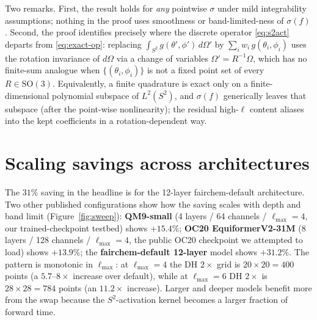 \documentclass{article}
\begin{document}
Two remarks. First, the result holds for \emph{any} pointwise $\sigma$
under mild integrability assumptions; nothing in the proof uses
smoothness or band-limited-ness of $\sigma(f)$. Second, the proof
identifies precisely where the discrete operator
\eqref{eq:s2act} departs from \eqref{eq:exact-op}: replacing
$\int_{S^2} g(\theta', \phi')\,d\Omega'$ by $\sum_i w_i\,
g(\theta_i, \phi_i)$ uses the rotation invariance of $d\Omega$ via a
change of variables $\Omega' = R^{-1}\Omega$, which has no
finite-sum analogue when $\{(\theta_i, \phi_i)\}$ is not a fixed
point set of every $R \in \mathrm{SO}(3)$. Equivalently, a finite
quadrature is exact only on a finite-dimensional polynomial subspace
of $L^2(S^2)$, and $\sigma(f)$ generically leaves that subspace
(after the point-wise nonlinearity); the residual high-$\ell$
content aliases into the kept coefficients in a
rotation-dependent way.

\section{Scaling savings across architectures}
\label{app:scale}

The $31\%$ saving in the headline is for the 12-layer fairchem-default
architecture. Two other published configurations show how the saving
scales with depth and band limit
(Figure~\ref{fig:sweep}): \textbf{QM9-small} (4 layers / 64 channels /
$\ell_{\max}{=}4$, our trained-checkpoint testbed) shows
$+15.4\%$; \textbf{OC20 EquiformerV2-31M} (8 layers / 128 channels /
$\ell_{\max}{=}4$, the public OC20 checkpoint we attempted to load)
shows $+13.9\%$; the \textbf{fairchem-default 12-layer} model shows
$+31.2\%$. The pattern is monotonic in $\ell_{\max}$: at
$\ell_{\max}{=}4$ the DH $2\times$ grid is $20\!\times\!20 = 400$
points (a $5.7$--$8\times$ increase over default), while at
$\ell_{\max}{=}6$ DH $2\times$ is $28\!\times\!28 = 784$ points
(an $11.2\times$ increase). Larger and deeper models benefit more
from the swap because the $S^2$-activation kernel becomes a larger
fraction of forward time.
\end{document}
